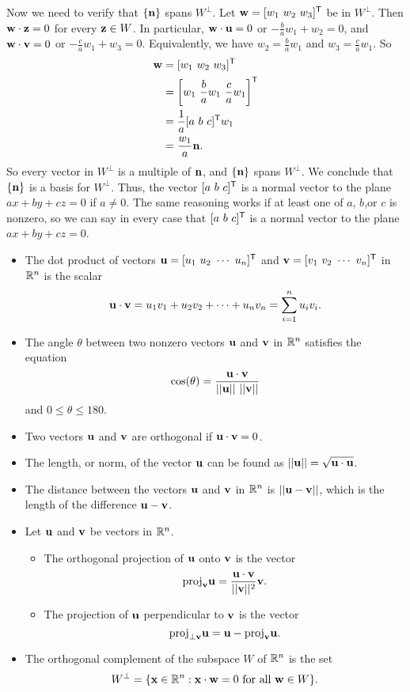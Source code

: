 \begin{example}
Now we need to verify that $\{\mathbf{n}\}$ spans $W^{\perp}$. Let $\mathbf{w} = [w_1 \ w_2 \ w_3]^{\mathsf{T}}$ be in $W^{\perp}$. Then $\mathbf{w} \cdot \mathbf{z} = 0$ for every $\mathbf{z} \in W$. In particular, $\mathbf{w} \cdot \mathbf{u} = 0$ or $-\frac{b}{a}w_1 + w_2 = 0$, and $\mathbf{w} \cdot \mathbf{v} = 0$ or $-\frac{c}{a}w_1 + w_3 = 0$. Equivalently, we have $w_2 = \frac{b}{a}w_1$ and $w_3 = \frac{c}{a}w_1$. So 
\begin{align*}
\mathbf{w} &=  [w_1 \ w_2 \ w_3]^{\mathsf{T}} \\
	&= \left[ w_1 \ \frac{b}{a}w_1 \ \frac{c}{a}w_1\right]^{\mathsf{T}} \\
	&= \frac{1}{a}[a \ b \ c]^{\mathsf{T}}w_1 \\
	&= \frac{w_1}{a} \mathbf{n}.
\end{align*}
So every vector in $W^{\perp}$ is a multiple of $\mathbf{n}$, and $\{\mathbf{n}\}$ spans $W^{\perp}$. We conclude that $\{\mathbf{n}\}$ is a basis for $W^{\perp}$.  Thus, the vector $[a \ b \ c]^{\mathsf{T}}$ is a normal vector to the plane $ax+by+cz=0$ if $a \neq 0$. The same reasoning works if at least one of $a$, $b$,or $c$ is nonzero, so we can say in every case that $[a \ b \ c]^{\mathsf{T}}$ is a normal vector to the plane $ax+by+cz=0$.

\ea

\end{example}


\begin{itemize}
\item The dot product of vectors $\mathbf{u} = [u_1 \ u_2 \  \cdots  \ u_n ]^{\mathsf{T}}$ and $\mathbf{v} = [ v_1 \ v_2 \ \cdots \ v_n ]^{\mathsf{T}}$ in $\mathbb{R}^n$ is the scalar 
\[\mathbf{u} \cdot \mathbf{v} = u_1v_1 + u_2v_2 + \cdots + u_nv_n = \displaystyle \sum_{i=1}^n u_iv_i.\]
\item The angle $\theta$ between two nonzero vectors $\mathbf{u}$ and $\mathbf{v}$ in $\mathbb{R}^n$ satisfies the equation
\[\cos(\theta) = \frac{\vu \cdot \vv}{||\vu|| \ ||\vv||}\]
and $0\leq \theta \leq 180$.
\item Two vectors $\mathbf{u}$ and $\mathbf{v}$ are orthogonal if $\mathbf{u} \cdot \mathbf{v} = 0$. 
\item The length, or norm, of the vector $\mathbf{u}$ can be found as $\displaystyle || \mathbf{u} || = \sqrt{\mathbf{u} \cdot \mathbf{u}}$.
\item The distance between the vectors $\mathbf{u}$ and $\mathbf{v}$ in $\mathbb{R}^n$ is $||\mathbf{u} - \mathbf{v} ||$, which is the length of the difference $\mathbf{u} - \mathbf{v}$.
\item Let $\mathbf{u}$ and $\mathbf{v}$ be vectors in $\mathbb{R}^n$. 
	\begin{itemize}
	\item The orthogonal projection of $\mathbf{u}$ onto $\mathbf{v}$ is the vector 
	\[\text{proj}_{\mathbf{v}} \mathbf{u} = \frac{\mathbf{u} \cdot \mathbf{v}}{||\mathbf{v}||^2} \mathbf{v}.\]
	\item The projection of $\mathbf{u}$ perpendicular to $\mathbf{v}$ is the vector 
	\[\text{proj}_{\perp \mathbf{v}} \mathbf{u} = \mathbf{u} - \text{proj}_{\mathbf{v}} \mathbf{u}.\]
	\end{itemize}
\item The orthogonal complement of the subspace $W$ of $\mathbb{R}^n$ is the set 
\[W^{\perp} = \{\mathbf{x} \in \mathbb{R}^n : \mathbf{x} \cdot \mathbf{w} = 0 \text{ for all } \mathbf{w} \in W\}.\]
\end{itemize}



